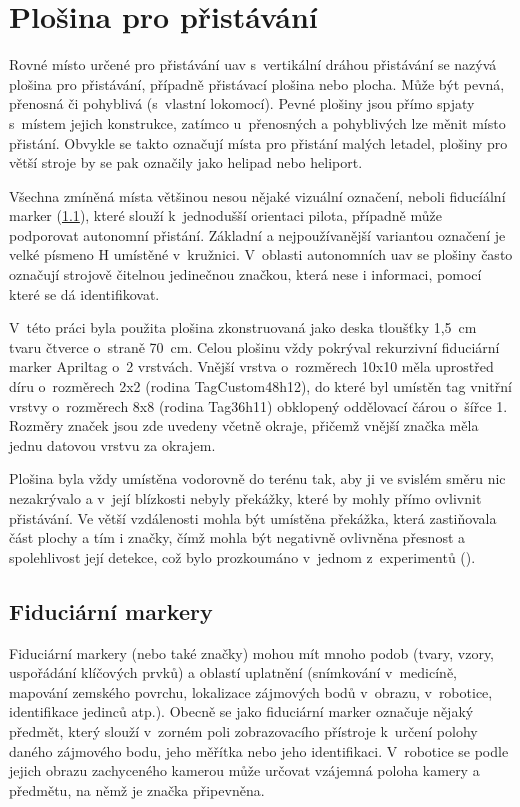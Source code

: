 \chapter{Plošina pro přistávání} \label{chap:pad}
  Rovné místo určené pro přistávání \acrshort{uav} s~vertikální dráhou přistávání se nazývá plošina pro přistávání, případně přistávací plošina nebo plocha. Může být pevná, přenosná či pohyblivá (s~vlastní lokomocí). Pevné plošiny jsou přímo spjaty s~místem jejich konstrukce, zatímco u~přenosných a pohyblivých lze měnit místo přistání. Obvykle se takto označují místa pro přistání malých letadel, plošiny pro větší stroje by se pak označily jako helipad nebo heliport.

  Všechna zmíněná místa většinou nesou nějaké vizuální označení, neboli fiducíální marker (\cref{sec:fidu}), které slouží k~jednodušší orientaci pilota, případně může podporovat autonomní přistání. Základní a nejpoužívanější variantou označení je velké písmeno H umístěné v~kružnici. V~oblasti autonomních \acrshort{uav} se plošiny často označují strojově čitelnou jedinečnou značkou, která nese i informaci, pomocí které se dá identifikovat.

  V~této práci byla použita plošina zkonstruovaná jako deska tloušťky 1{,}5~cm tvaru čtverce o~straně 70~cm. Celou plošinu vždy pokrýval rekurzivní fiduciární marker Apriltag o~2 vrstvách. Vnější vrstva o~rozměrech 10x10 měla uprostřed díru o~rozměrech 2x2 (rodina TagCustom48h12), do které byl umístěn tag vnitřní vrstvy o~rozměrech 8x8 (rodina Tag36h11) obklopený oddělovací čárou o~šířce 1. Rozměry značek jsou zde uvedeny včetně okraje, přičemž vnější značka měla jednu datovou vrstvu za okrajem.
  
  Plošina byla vždy umístěna vodorovně do terénu tak, aby ji ve svislém směru nic nezakrývalo a v~její blízkosti nebyly překážky, které by mohly přímo ovlivnit přistávání. Ve větší vzdálenosti mohla být umístěna překážka, která zastiňovala část plochy a tím i značky, čímž mohla být negativně ovlivněna přesnost a spolehlivost její detekce, což bylo prozkoumáno v~jednom z~experimentů ().
  \section{Fiduciární markery} \label{sec:fidu} %
    Fiduciární markery (nebo také značky) mohou mít mnoho podob (tvary, vzory, uspořádání klíčových prvků) a oblastí uplatnění (snímkování v~medicíně, mapování zemského povrchu, lokalizace zájmových bodů v~obrazu, v~robotice, identifikace jedinců atp.). Obecně se jako fiduciární marker označuje nějaký předmět, který slouží v~zorném poli zobrazovacího přístroje k~určení polohy daného zájmového bodu, jeho měřítka nebo jeho identifikaci. V~robotice se podle jejich obrazu zachyceného kamerou může určovat vzájemná poloha kamery a předmětu, na němž je značka připevněna.~\cite{kostak:fidmark}
    
